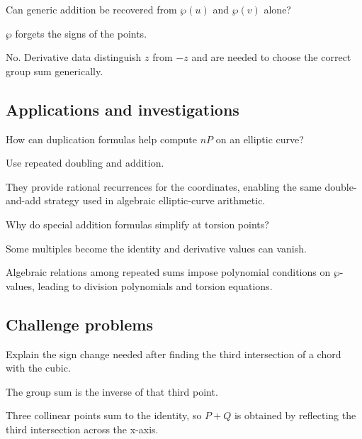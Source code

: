 \begin{exercise}\label{exr:iv30-expand-12}
Can generic addition be recovered from \(\wp(u)\) and \(\wp(v)\) alone?
\end{exercise}
\begin{hint}
\(\wp\) forgets the signs of the points.
\end{hint}
\begin{solution}
No. Derivative data distinguish \(z\) from \(-z\) and are needed to choose the correct group sum generically.
\end{solution}

\subsection*{Applications and investigations}

\begin{exercise}\label{exr:iv30-expand-13}
How can duplication formulas help compute \(nP\) on an elliptic curve?
\end{exercise}
\begin{hint}
Use repeated doubling and addition.
\end{hint}
\begin{solution}
They provide rational recurrences for the coordinates, enabling the same double-and-add strategy used in algebraic elliptic-curve arithmetic.
\end{solution}

\begin{exercise}\label{exr:iv30-expand-14}
Why do special addition formulas simplify at torsion points?
\end{exercise}
\begin{hint}
Some multiples become the identity and derivative values can vanish.
\end{hint}
\begin{solution}
Algebraic relations among repeated sums impose polynomial conditions on \(\wp\)-values, leading to division polynomials and torsion equations.
\end{solution}

\subsection*{Challenge problems}

\begin{exercise}\label{exr:iv30-expand-15}
Explain the sign change needed after finding the third intersection of a chord with the cubic.
\end{exercise}
\begin{hint}
The group sum is the inverse of that third point.
\end{hint}
\begin{solution}
Three collinear points sum to the identity, so \(P+Q\) is obtained by reflecting the third intersection across the x-axis.
\end{solution}

